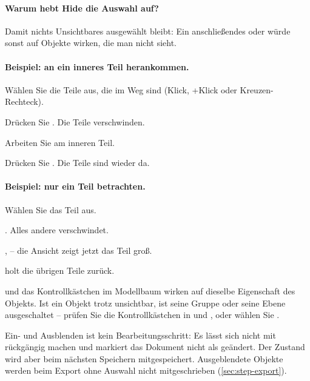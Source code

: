 \paragraph{Warum hebt Hide die Auswahl auf?} Damit nichts Unsichtbares ausgewählt bleibt: Ein
anschließendes  oder  würde sonst auf Objekte wirken, die man nicht
sieht.

\paragraph{Beispiel: an ein inneres Teil herankommen.}
\begin{schritte}
  \item Wählen Sie die Teile aus, die im Weg sind (Klick, +Klick oder
    Kreuzen-Rechteck).
  \item Drücken Sie . Die Teile verschwinden.
  \item Arbeiten Sie am inneren Teil.
  \item Drücken Sie . Die Teile sind wieder da.
\end{schritte}

\paragraph{Beispiel: nur ein Teil betrachten.}
\begin{schritte}
  \item Wählen Sie das Teil aus.
  \item {}. Alles andere verschwindet.
  \item {},  -- die Ansicht zeigt jetzt das Teil groß.
  \item {} holt die übrigen Teile zurück.
\end{schritte}

\begin{hinweis}
 und das Kontrollkästchen im Modellbaum wirken auf dieselbe Eigenschaft des
Objekts. Ist ein Objekt trotz  unsichtbar, ist seine Gruppe oder seine Ebene
ausgeschaltet -- prüfen Sie die Kontrollkästchen in  und , oder wählen
Sie .
\end{hinweis}

\begin{warnung}
Ein- und Ausblenden ist kein Bearbeitungsschritt: Es lässt sich nicht mit 
rückgängig machen und markiert das Dokument nicht als geändert. Der Zustand wird aber beim
nächsten Speichern mitgespeichert. Ausgeblendete Objekte werden beim Export ohne Auswahl
nicht mitgeschrieben (\autoref{sec:step-export}).
\end{warnung}
